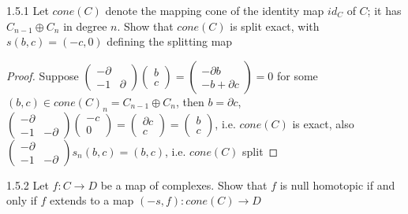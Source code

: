 \documentclass[../main.tex]{subfiles}
\begin{document}
\begin{customexercise}{1.5.1}
Let $cone(C)$ denote the mapping cone of the identity map $id_C$ of $C$; it has $C_{n-1}\oplus C_n$ in degree $n$. Show that $cone(C)$ is split exact, with $s(b,c)=(-c,0)$ defining the splitting map
\end{customexercise}

\begin{proof}
Suppose $\begin{pmatrix}
-\partial & \\
-1 & \partial
\end{pmatrix}\begin{pmatrix}
b \\
c
\end{pmatrix}=\begin{pmatrix}
-\partial b \\
-b+\partial c
\end{pmatrix}=0$ for some $(b,c)\in cone(C)_n=C_{n-1}\oplus C_n$, then $b=\partial c$, $\begin{pmatrix}
-\partial & \\
-1 & -\partial
\end{pmatrix}\begin{pmatrix}
-c \\
0
\end{pmatrix}=\begin{pmatrix}
\partial c \\
c
\end{pmatrix}=\begin{pmatrix}
b \\
c
\end{pmatrix}$, i.e. $cone(C)$ is exact, also $\begin{pmatrix}
-\partial & \\
-1 & -\partial
\end{pmatrix}s_n(b,c)=(b,c)$, i.e. $cone(C)$ split
\end{proof}

\begin{customexercise}{1.5.2}
Let $f:C\to D$ be a map of complexes. Show that $f$ is null homotopic if and only if $f$ extends to a map $(-s,f):cone(C)\to D$
\end{customexercise}
\end{document}
